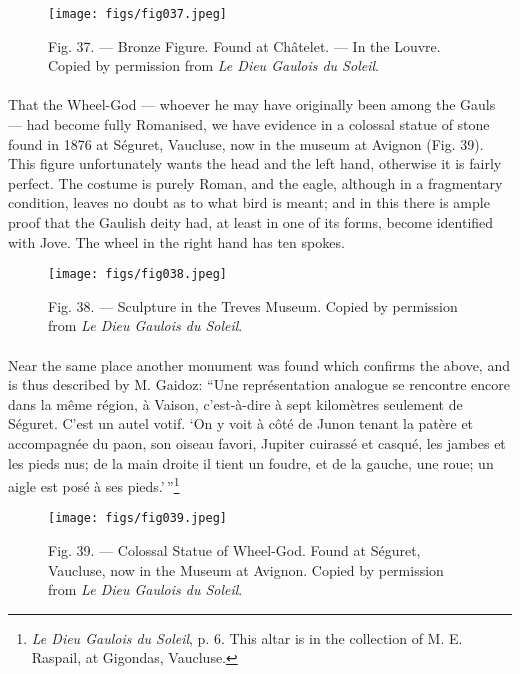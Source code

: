 \documentclass[a4paper, 11pt, oneside, polutonikogreek, english]{article}
\begin{document}
\begin{figure}[H]
\centering
\texttt{[image: figs/fig037.jpeg]}
\caption[Fig. 37. --- Bronze Figure.]{Fig. 37. --- Bronze Figure. Found at Châtelet. --- In the Louvre. Copied by permission from \emph{Le Dieu Gaulois du Soleil}.}
\end{figure}
\paragraph{}
That the Wheel-God --- whoever he may have originally been among the Gauls --- had become fully Romanised, we have evidence in a colossal statue of stone found in 1876 at Séguret, Vaucluse, now in the museum at Avignon (Fig. 39). This figure unfortunately wants the head and the left hand, otherwise it is fairly perfect. The costume is purely Roman, and the eagle, although in a fragmentary condition, leaves no doubt as to what bird is meant; and in this there is ample proof that the Gaulish deity had, at least in one of its forms, become identified with Jove. The wheel in the right hand has ten spokes.

\begin{figure}[H]
\centering
\texttt{[image: figs/fig038.jpeg]}
\caption[Fig. 38. --- Sculpture in the Treves Museum.]{Fig. 38. --- Sculpture in the Treves Museum. Copied by permission from \emph{Le Dieu Gaulois du Soleil}.}
\end{figure}
\paragraph{}
Near the same place another monument was found which confirms the above, and is thus described by M. Gaidoz: ``Une représentation analogue se rencontre encore dans la même région, à Vaison, c'est-à-dire à sept kilomètres seulement de Séguret. C'est un autel votif. `On y voit à côté de Junon tenant la patère et accompagnée du paon, son oiseau favori, Jupiter cuirassé et casqué, les jambes et les pieds nus; de la main droite il tient un foudre, et de la gauche, une roue; un aigle est posé à ses pieds.'\,''\footnote{\emph{Le Dieu Gaulois du Soleil}, p. 6. This altar is in the collection of M. E. Raspail, at Gigondas, Vaucluse.}

\begin{figure}[H]
\centering
\texttt{[image: figs/fig039.jpeg]}
\caption[Fig. 39. --- Colossal Statue of Wheel-God.]{Fig. 39. --- Colossal Statue of Wheel-God. Found at Séguret, Vaucluse, now in the Museum at Avignon. Copied by permission from \emph{Le Dieu Gaulois du Soleil}.}
\end{figure}
\end{document}
